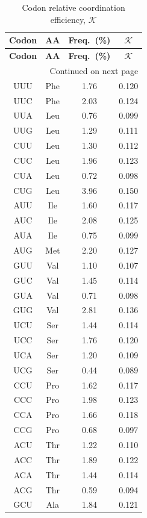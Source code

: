 \documentclass[12pt,a4paper]{article}
\newcommand{\REL}{\mathcal{K}}          %
\begin{document}
	\begin{longtable}{|c|c|c|c|}
		\caption{Codon relative coordination efficiency, \(\REL\)}\label{tab:codons}\\
		\hline
		\textbf{Codon} & \textbf{AA} & \textbf{Freq.\ (\%)} & \(\REL\) \\
		\hline
		\endfirsthead
		\hline
		\textbf{Codon} & \textbf{AA} & \textbf{Freq.\ (\%)} & \(\REL\) \\
		\hline
		\endhead
		\hline
		\multicolumn{4}{r}{Continued on next page}\\
		\endfoot
		\hline
		\endlastfoot
		UUU & Phe & 1.76 & 0.120 \\
		UUC & Phe & 2.03 & 0.124 \\
		UUA & Leu & 0.76 & 0.099 \\
		UUG & Leu & 1.29 & 0.111 \\
		CUU & Leu & 1.30 & 0.112 \\
		CUC & Leu & 1.96 & 0.123 \\
		CUA & Leu & 0.72 & 0.098 \\
		CUG & Leu & 3.96 & 0.150 \\
		AUU & Ile & 1.60 & 0.117 \\
		AUC & Ile & 2.08 & 0.125 \\
		AUA & Ile & 0.75 & 0.099 \\
		AUG & Met & 2.20 & 0.127 \\
		GUU & Val & 1.10 & 0.107 \\
		GUC & Val & 1.45 & 0.114 \\
		GUA & Val & 0.71 & 0.098 \\
		GUG & Val & 2.81 & 0.136 \\
		UCU & Ser & 1.44 & 0.114 \\
		UCC & Ser & 1.76 & 0.120 \\
		UCA & Ser & 1.20 & 0.109 \\
		UCG & Ser & 0.44 & 0.089 \\
		CCU & Pro & 1.62 & 0.117 \\
		CCC & Pro & 1.98 & 0.123 \\
		CCA & Pro & 1.66 & 0.118 \\
		CCG & Pro & 0.68 & 0.097 \\
		ACU & Thr & 1.22 & 0.110 \\
		ACC & Thr & 1.89 & 0.122 \\
		ACA & Thr & 1.44 & 0.114 \\
		ACG & Thr & 0.59 & 0.094 \\
		GCU & Ala & 1.84 & 0.121 \\

\end{longtable}
\end{document}
